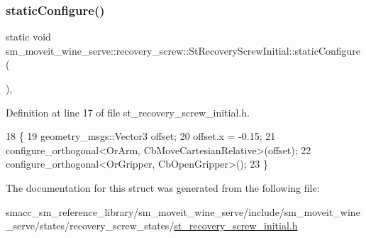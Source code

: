 \subsubsection{\texorpdfstring{static\+Configure()}{staticConfigure()}}
{\footnotesize\ttfamily static void sm\+\_\+moveit\+\_\+wine\+\_\+serve\+::recovery\+\_\+screw\+::\+St\+Recovery\+Screw\+Initial\+::static\+Configure (\begin{DoxyParamCaption}{ }\end{DoxyParamCaption})\hspace{0.3cm}{\ttfamily [inline]}, {\ttfamily [static]}}



Definition at line 17 of file st\+\_\+recovery\+\_\+screw\+\_\+initial.\+h.


\begin{DoxyCode}
18             \{
19                 geometry\_msgs::Vector3 offset;
20                 offset.x = -0.15;
21                 configure\_orthogonal<OrArm, CbMoveCartesianRelative>(offset);
22                 configure\_orthogonal<OrGripper, CbOpenGripper>();
23             \}
\end{DoxyCode}


The documentation for this struct was generated from the following file\+:\begin{DoxyCompactItemize}
\item 
smacc\+\_\+sm\+\_\+reference\+\_\+library/sm\+\_\+moveit\+\_\+wine\+\_\+serve/include/sm\+\_\+moveit\+\_\+wine\+\_\+serve/states/recovery\+\_\+screw\+\_\+states/\hyperlink{sm__moveit__wine__serve_2include_2sm__moveit__wine__serve_2states_2recovery__screw__states_2st__recovery__screw__initial_8h}{st\+\_\+recovery\+\_\+screw\+\_\+initial.\+h}\end{DoxyCompactItemize}
